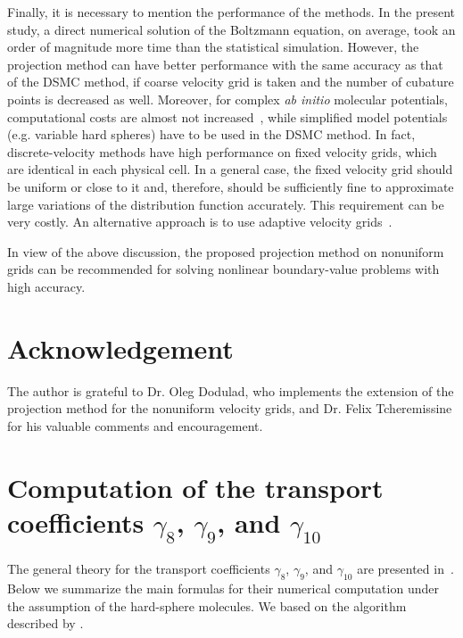 \documentclass[]{elsarticle} %
\begin{document}
Finally, it is necessary to mention the performance of the methods.
In the present study, a direct numerical solution of the Boltzmann equation, on average,
took an order of magnitude more time than the statistical simulation.
However, the projection method can have better performance with the same accuracy as that of the DSMC method,
if coarse velocity grid is taken and the number of cubature points is decreased as well.
Moreover, for complex \textit{ab initio} molecular potentials, computational costs are almost not increased~\citep{Dodulad2014},
while simplified model potentials (e.g. variable hard spheres) have to be used in the DSMC method.
In fact, discrete-velocity methods have high performance on fixed velocity grids,
which are identical in each physical cell.
In a general case, the fixed velocity grid should be uniform or close to it and, therefore,
should be sufficiently fine to approximate large variations of the distribution function accurately.
This requirement can be very costly. An alternative approach is to use adaptive velocity grids~\citep{Kolobov2013}.

In view of the above discussion, the proposed projection method on nonuniform grids can be recommended
for solving nonlinear boundary-value problems with high accuracy.

\section*{Acknowledgement}

The author is grateful to Dr. Oleg Dodulad, who implements the extension
of the projection method for the nonuniform velocity grids,
and Dr. Felix Tcheremissine for his valuable comments and encouragement.

\appendix

\section{Computation of the transport coefficients \(\gamma_8\), \(\gamma_9\), and \(\gamma_{10}\)}
\label{sec:gamma_coeffs}

The general theory for the transport coefficients \(\gamma_8\), \(\gamma_9\), and \(\gamma_{10}\)
are presented in~\citep{Sone2000, Sone2002}.
Below we summarize the main formulas for their numerical computation
under the assumption of the hard-sphere molecules.
We based on the algorithm described by \citet{Ohwada1992}.
\end{document}
